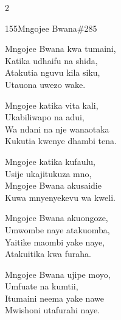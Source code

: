 \documentclass{article}
\begin{document}
\begin{multicols}{2}
\begin{hymn}{155}{Mngojee Bwana}{\#285}
\begin{stanza}
Mngojee Bwana kwa tumaini,\\
Katika udhaifu na shida,\\
Atakutia nguvu kila siku,\\
Utauona uwezo wake.
\end{stanza}
\begin{stanza}
Mngojee katika vita kali,\\
Ukabiliwapo na adui,\\
Wa ndani na nje wanaotaka\\
Kukutia kwenye dhambi tena.
\end{stanza}
\begin{stanza}
Mngojee katika kufaulu,\\
Usije ukajitukuza mno,\\
Mngojee Bwana akusaidie\\
Kuwa mnyenyekevu wa kweli.
\end{stanza}
\begin{stanza}
Mngojee Bwana akuongoze,\\
Umwombe naye atakuomba,\\
Yaitike maombi yake naye,\\
Atakuitika kwa furaha.
\end{stanza}
\begin{stanza}
Mngojee Bwana ujipe moyo,\\
Umfuate na kumtii,\\
Itumaini neema yake nawe\\
Mwishoni utafurahi naye.
\end{stanza}
\end{hymn}


\end{multicols}
\end{document}
